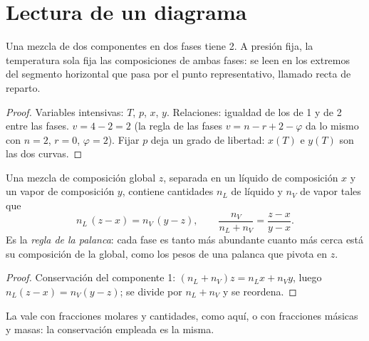 \section{Lectura de un diagrama}

\begin{proposition}\label{prop:b2:liquid-vapour-diagrams:variance}
Una mezcla de dos componentes en dos fases tiene  2. A presión fija,
la temperatura sola fija las composiciones de ambas fases: se leen
en los extremos del segmento horizontal que pasa por el punto representativo,
llamado recta de reparto.
\end{proposition}

\begin{proof}
Variables intensivas: $T$, $p$, $x$, $y$. Relaciones: igualdad de los  de 1 y de 2 entre las fases. $v = 4 - 2 = 2$ (la regla de las fases
$v = n - r + 2 - \varphi$ da lo mismo con $n = 2$, $r = 0$, $\varphi = 2$).
Fijar $p$ deja un grado de libertad: $x(T)$ e $y(T)$ son las dos curvas.
\end{proof}

\begin{theorem}\label{thm:b2:liquid-vapour-diagrams:lever}
Una mezcla de composición global $z$, separada en un líquido de composición $x$
y un vapor de composición $y$, contiene cantidades $n_L$ de líquido y $n_V$ de
vapor tales que
\[
  n_L\,(z - x) = n_V\,(y - z), \qquad \frac{n_V}{n_L + n_V} = \frac{z - x}{y - x} .
\]
Es la \emph{regla de la palanca}: cada fase es tanto más
abundante cuanto más cerca está su composición de la global, como los pesos de
una palanca que pivota en $z$.
\end{theorem}

\begin{proof}
Conservación del componente 1: $(n_L + n_V)z = n_Lx + n_Vy$, luego $n_L(z - x) =
n_V(y - z)$; se divide por $n_L + n_V$ y se reordena.
\end{proof}

La  vale con fracciones molares y cantidades, como aquí, o con fracciones
másicas y masas: la conservación empleada es la misma.

